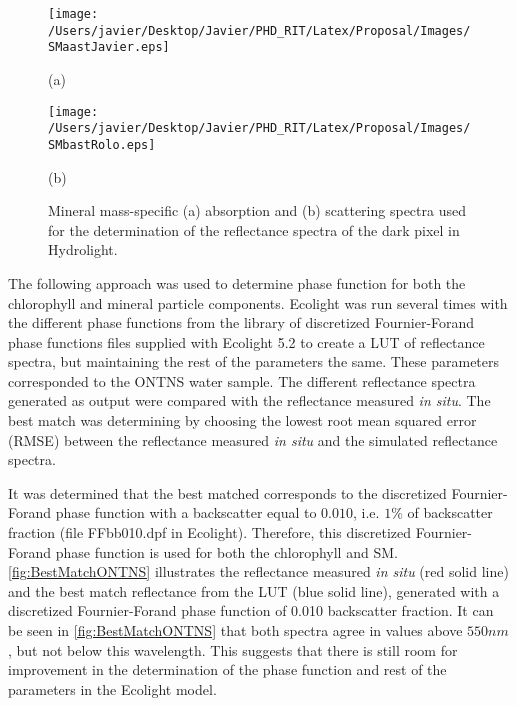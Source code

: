 \begin{figure}[!ht]
  \begin{minipage}[c]{0.48\linewidth}
  	\centering
  	\texttt{[image: /Users/javier/Desktop/Javier/PHD\_RIT/Latex/Proposal/Images/SMaastJavier.eps]}
    \centerline{(a)}\medskip
  \end{minipage}     
  \hfill
  \begin{minipage}[c]{0.48\linewidth}
  	\centering
  	\texttt{[image: /Users/javier/Desktop/Javier/PHD\_RIT/Latex/Proposal/Images/SMbastRolo.eps]}
    \centerline{(b)}\medskip
  \end{minipage} 
  \caption{Mineral mass-specific (a) absorption and (b) scattering spectra used for the determination of the reflectance spectra of the dark pixel in Hydrolight. \label{fig:SMabast} }     
\end{figure}

The following approach was used to determine phase function\label{pag:phasefn} for both the chlorophyll and mineral particle components. Ecolight was run several times with the different phase functions from the library of discretized Fournier-Forand phase functions files supplied with Ecolight 5.2 to create a LUT of reflectance spectra, but maintaining the rest of the parameters the same. These parameters corresponded to the ONTNS water sample. The different reflectance spectra generated as output were compared with the reflectance measured {\it in situ}. The best match was determining by choosing the lowest root mean squared error (RMSE) between the reflectance measured {\it in situ} and the simulated reflectance spectra.

It was determined that the best matched corresponds to the discretized Fournier-Forand phase function with a backscatter equal to $0.010$, i.e. $1\%$ of backscatter fraction (file FFbb010.dpf in Ecolight). Therefore, this discretized Fournier-Forand phase function is used for both the chlorophyll and SM. \autoref{fig:BestMatchONTNS} illustrates the reflectance measured {\it in situ} (red solid line) and the best match reflectance from the LUT (blue solid line), generated with a discretized Fournier-Forand phase function of 0.010 backscatter fraction. It can be seen in \autoref{fig:BestMatchONTNS} that both spectra agree in values above $550nm$, but not below this wavelength. This suggests that there is still room for improvement in the determination of the phase function and rest of the parameters in the Ecolight model.

